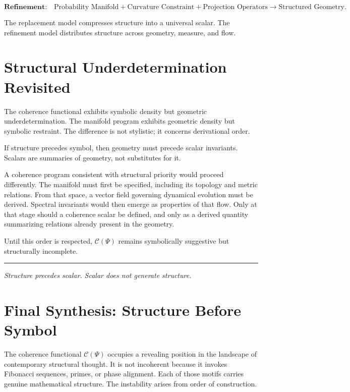 \documentclass[12pt]{article}
\begin{document}
\[
  \textbf{Refinement:}
  \quad
  \text{Probability Manifold} 
  + \text{Curvature Constraint}
  + \text{Projection Operators}
  \rightarrow \text{Structured Geometry}.
\]

The replacement model compresses structure into a universal scalar. The refinement model distributes structure across geometry, measure, and flow.

\section{Structural Underdetermination Revisited}

The coherence functional exhibits symbolic density but geometric underdetermination. The manifold program exhibits geometric density but symbolic restraint. The difference is not stylistic; it concerns derivational order.

If structure precedes symbol, then geometry must precede scalar invariants. Scalars are summaries of geometry, not substitutes for it.

A coherence program consistent with structural priority would proceed differently. The manifold must first be specified, including its topology and metric relations. From that space, a vector field governing dynamical evolution must be derived. Spectral invariants would then emerge as properties of that flow. Only at that stage should a coherence scalar be defined, and only as a derived quantity summarizing relations already present in the geometry.

Until this order is respected, $\mathcal{C}(\Psi)$ remains symbolically suggestive but structurally incomplete.

\bigskip
\hrule
\bigskip

\begin{center}
\small\itshape
Structure precedes scalar.  
Scalar does not generate structure.
\end{center}

\section{Final Synthesis: Structure Before Symbol}

The coherence functional $\mathcal{C}(\Psi)$ occupies a revealing position in the landscape of contemporary structural thought. It is not incoherent because it invokes Fibonacci sequences, primes, or phase alignment. Each of those motifs carries genuine mathematical structure. The instability arises from order of construction.
\end{document}
